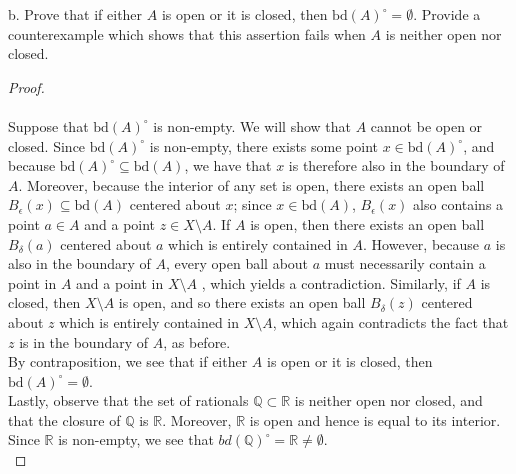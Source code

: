 \pagebreak

b. Prove that if either $A$ is open or it is closed, then $\text{bd}(A)^{\circ} = \emptyset$. Provide a counterexample
   which shows that this assertion fails when $A$ is neither open nor closed. \ \\
    
\begin{proof}\ \\\\
    Suppose that $\text{bd}(A)^{\circ}$ is non-empty. We will show that $A$ cannot be open or closed. Since 
    $\text{bd}(A)^{\circ}$ is non-empty, there exists some point $x \in \text{bd}(A)^{\circ}$, and because 
    $\text{bd}(A)^{\circ} \subseteq \text{bd}(A)$, we have that $x$ is therefore also in the boundary of $A$. Moreover, 
    because the interior of any set is open, there exists an open ball $B_{\epsilon}(x) \subseteq \text{bd}(A)$ centered
    about $x$; since $x \in \text{bd}(A)$, $B_{\epsilon}(x)$ also contains a point $a \in A$ and a point 
    $z \in X \setminus A$. If $A$ is open, then there exists an open ball $B_{\delta}(a)$ centered about $a$ which is 
    entirely contained in $A$. However, because $a$ is also in the boundary of $A$, every open ball about $a$ must 
    necessarily contain a point in $A$ and a point in $X \setminus A$ , which yields a contradiction. Similarly, if $A$ 
    is closed, then $X \setminus A$ is open, and so there exists an open ball $B_{\delta}(z)$ centered about $z$ which 
    is entirely contained in $X \setminus A$, which again contradicts the fact that $z$ is in the boundary of $A$, as 
    before. \\

    By contraposition, we see that if either $A$ is open or it is closed, then $\text{bd}(A)^{\circ} = \emptyset$. \\

    Lastly, observe that the set of rationals $\mathbb{Q} \subset \mathbb{R}$ is neither open nor closed, and that the
    closure of $\mathbb{Q}$ is $\mathbb{R}$. Moreover, $\mathbb{R}$ is open and hence is equal to its interior. Since
    $\mathbb{R}$ is non-empty, we see that $bd(\mathbb{Q})^{\circ} = \mathbb{R} \neq \emptyset$.
    \ \\
\end{proof}

\pagebreak